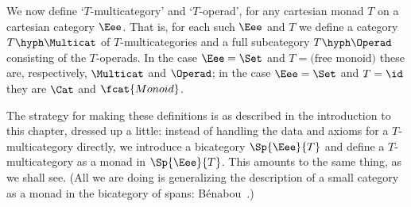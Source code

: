We now define `$T$-multicategory' and `$T$-operad', for any cartesian monad
$T$ on a cartesian category $\Eee$.  That is, for each such $\Eee$ and $T$
we define a category $T\hyph\Multicat$ of $T$-multicategories and a full
subcategory $T\hyph\Operad$ consisting of the $T$-operads.  In the case
$\Eee=\Set$ and $T=\textrm{(free monoid)}$ these are, respectively,
$\Multicat$ and $\Operad$; in the case $\Eee=\Set$ and $T=\id$ they are
$\Cat$ and $\fcat{Monoid}$.%
% 
% 

The strategy for making these definitions is as described in the
introduction to this chapter, dressed up a little: instead of handling the
data and axioms for a $T$-multicategory directly, we introduce a bicategory
$\Sp{\Eee}{T}$%
% 
% 
and define a $T$-multicategory as a monad in $\Sp{\Eee}{T}$.
This amounts to the same thing, as we shall see.  (All we are doing is
generalizing the description of a small category as a monad in the
bicategory%
%
%
%
%
of spans: B\'enabou~\cite[5.4.3]{Ben}.)%
%
%


